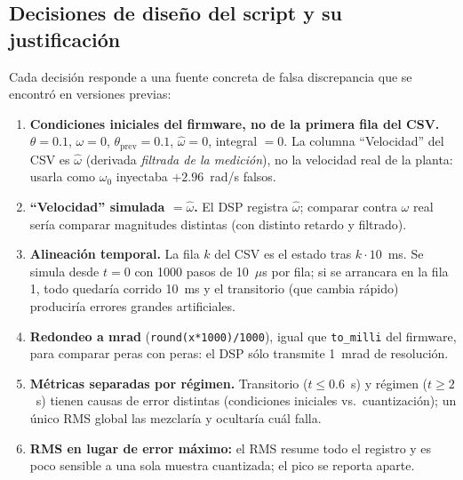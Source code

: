 \documentclass[11pt,a4paper]{article}
\begin{document}
\subsection{Decisiones de dise\~no del script y su justificaci\'on}
Cada decisi\'on responde a una fuente concreta de falsa discrepancia que se encontr\'o en versiones previas:
\begin{enumerate}[leftmargin=1.6em]
\item \textbf{Condiciones iniciales del firmware, no de la primera fila del CSV.}
$\theta=0.1$, $\omega=0$, $\theta_{\mathrm{prev}}=0.1$, $\hat\omega=0$, integral $=0$. La columna ``Velocidad'' del
CSV es $\hat\omega$ (derivada \emph{filtrada de la medici\'on}), no la velocidad real de la planta: usarla como
$\omega_0$ inyectaba $+2.96$~rad/s falsos.
\item \textbf{``Velocidad'' simulada $=\hat\omega$.} El DSP registra $\hat\omega$; comparar contra $\omega$ real
ser\'ia comparar magnitudes distintas (con distinto retardo y filtrado).
\item \textbf{Alineaci\'on temporal.} La fila $k$ del CSV es el estado tras $k\cdot10$~ms. Se simula desde $t=0$
con 1000 pasos de 10~$\mu$s por fila; si se arrancara en la fila 1, todo quedar\'ia corrido 10~ms y el transitorio
(que cambia r\'apido) producir\'ia errores grandes artificiales.
\item \textbf{Redondeo a mrad} (\texttt{round(x*1000)/1000}), igual que \texttt{to\_milli} del firmware, para
comparar peras con peras: el DSP s\'olo transmite 1~mrad de resoluci\'on.
\item \textbf{M\'etricas separadas por r\'egimen.} Transitorio ($t\le0.6$~s) y r\'egimen ($t\ge2$~s) tienen causas de error
distintas (condiciones iniciales vs.\ cuantizaci\'on); un \'unico RMS global las mezclar\'ia y ocultar\'ia cu\'al falla.
\item \textbf{RMS en lugar de error m\'aximo:} el RMS resume todo el registro y es poco sensible a una sola muestra
cuantizada; el pico se reporta aparte.
\end{enumerate}
\end{document}

